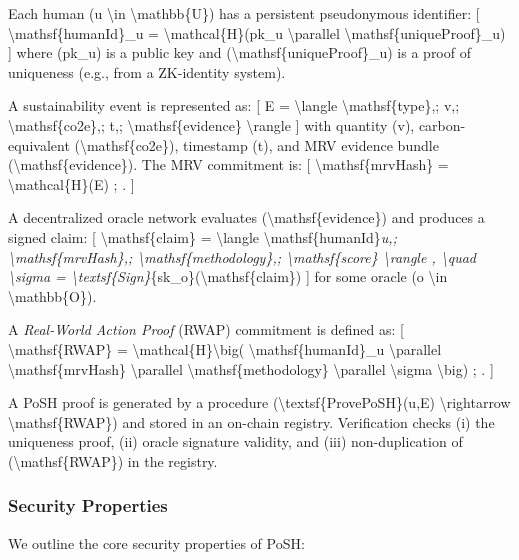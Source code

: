 \documentclass{article}
\begin{document}
Each human (u {\textbackslash}in {\textbackslash}mathbb\{U\}) has a persistent pseudonymous identifier:
[
{\textbackslash}mathsf\{humanId\}\_u = {\textbackslash}mathcal\{H\}(pk\_u {\textbackslash}parallel {\textbackslash}mathsf\{uniqueProof\}\_u)
]
where (pk\_u) is a public key and ({\textbackslash}mathsf\{uniqueProof\}\_u) is a proof of
uniqueness (e.g., from a ZK-identity system).

A sustainability event is represented as:
[
E = {\textbackslash}langle {\textbackslash}mathsf\{type\},; v,; {\textbackslash}mathsf\{co2e\},; t,; {\textbackslash}mathsf\{evidence\} {\textbackslash}rangle
]
with quantity (v), carbon-equivalent ({\textbackslash}mathsf\{co2e\}), timestamp (t), and
MRV evidence bundle ({\textbackslash}mathsf\{evidence\}). The MRV commitment is:
[
{\textbackslash}mathsf\{mrvHash\} = {\textbackslash}mathcal\{H\}(E) ; .
]

A decentralized oracle network evaluates ({\textbackslash}mathsf\{evidence\}) and produces a
signed claim:
[
{\textbackslash}mathsf\{claim\} = {\textbackslash}langle {\textbackslash}mathsf\{humanId\}\textit{u,; {\textbackslash}mathsf\{mrvHash\},;
{\textbackslash}mathsf\{methodology\},; {\textbackslash}mathsf\{score\} {\textbackslash}rangle , {\textbackslash}quad
{\textbackslash}sigma = {\textbackslash}textsf\{Sign\}}\{sk\_o\}({\textbackslash}mathsf\{claim\})
]
for some oracle (o {\textbackslash}in {\textbackslash}mathbb\{O\}).

A \textit{Real-World Action Proof} (RWAP) commitment is defined as:
[
{\textbackslash}mathsf\{RWAP\} =
{\textbackslash}mathcal\{H\}{\textbackslash}big(
{\textbackslash}mathsf\{humanId\}\_u {\textbackslash}parallel
{\textbackslash}mathsf\{mrvHash\} {\textbackslash}parallel
{\textbackslash}mathsf\{methodology\} {\textbackslash}parallel
{\textbackslash}sigma
{\textbackslash}big) ; .
]

A PoSH proof is generated by a procedure
({\textbackslash}textsf\{ProvePoSH\}(u,E) {\textbackslash}rightarrow {\textbackslash}mathsf\{RWAP\}) and stored in an on-chain
registry. Verification checks (i) the uniqueness proof, (ii) oracle signature
validity, and (iii) non-duplication of ({\textbackslash}mathsf\{RWAP\}) in the registry.

\subsubsection{Security Properties}

We outline the core security properties of PoSH:
\end{document}
